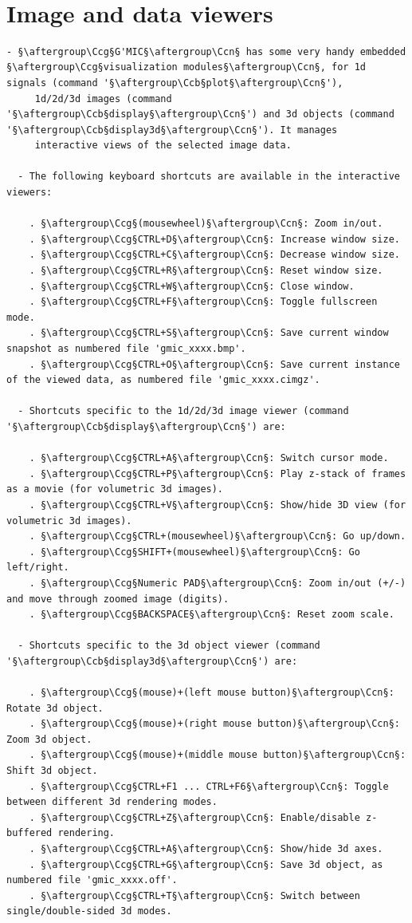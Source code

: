 \documentclass[a4paper,10.5pt,twoside]{book}
\def\Ccb{\color{cb}}
\def\Ccg{\color{cc}}
\def\Ccn{\color{black}}
\begin{document}
\normalsize
~\\\section{Image and data viewers}
\small
\begin{lstlisting}[escapechar=§]
  - §\aftergroup\Ccg§G'MIC§\aftergroup\Ccn§ has some very handy embedded §\aftergroup\Ccg§visualization modules§\aftergroup\Ccn§, for 1d signals (command '§\aftergroup\Ccb§plot§\aftergroup\Ccn§'), 
     1d/2d/3d images (command '§\aftergroup\Ccb§display§\aftergroup\Ccn§') and 3d objects (command '§\aftergroup\Ccb§display3d§\aftergroup\Ccn§'). It manages 
     interactive views of the selected image data. 
 
  - The following keyboard shortcuts are available in the interactive viewers: 
 
    . §\aftergroup\Ccg§(mousewheel)§\aftergroup\Ccn§: Zoom in/out. 
    . §\aftergroup\Ccg§CTRL+D§\aftergroup\Ccn§: Increase window size. 
    . §\aftergroup\Ccg§CTRL+C§\aftergroup\Ccn§: Decrease window size. 
    . §\aftergroup\Ccg§CTRL+R§\aftergroup\Ccn§: Reset window size. 
    . §\aftergroup\Ccg§CTRL+W§\aftergroup\Ccn§: Close window. 
    . §\aftergroup\Ccg§CTRL+F§\aftergroup\Ccn§: Toggle fullscreen mode. 
    . §\aftergroup\Ccg§CTRL+S§\aftergroup\Ccn§: Save current window snapshot as numbered file 'gmic_xxxx.bmp'. 
    . §\aftergroup\Ccg§CTRL+O§\aftergroup\Ccn§: Save current instance of the viewed data, as numbered file 'gmic_xxxx.cimgz'. 
 
  - Shortcuts specific to the 1d/2d/3d image viewer (command '§\aftergroup\Ccb§display§\aftergroup\Ccn§') are: 
 
    . §\aftergroup\Ccg§CTRL+A§\aftergroup\Ccn§: Switch cursor mode. 
    . §\aftergroup\Ccg§CTRL+P§\aftergroup\Ccn§: Play z-stack of frames as a movie (for volumetric 3d images). 
    . §\aftergroup\Ccg§CTRL+V§\aftergroup\Ccn§: Show/hide 3D view (for volumetric 3d images). 
    . §\aftergroup\Ccg§CTRL+(mousewheel)§\aftergroup\Ccn§: Go up/down. 
    . §\aftergroup\Ccg§SHIFT+(mousewheel)§\aftergroup\Ccn§: Go left/right. 
    . §\aftergroup\Ccg§Numeric PAD§\aftergroup\Ccn§: Zoom in/out (+/-) and move through zoomed image (digits). 
    . §\aftergroup\Ccg§BACKSPACE§\aftergroup\Ccn§: Reset zoom scale. 
 
  - Shortcuts specific to the 3d object viewer (command '§\aftergroup\Ccb§display3d§\aftergroup\Ccn§') are: 
 
    . §\aftergroup\Ccg§(mouse)+(left mouse button)§\aftergroup\Ccn§: Rotate 3d object. 
    . §\aftergroup\Ccg§(mouse)+(right mouse button)§\aftergroup\Ccn§: Zoom 3d object. 
    . §\aftergroup\Ccg§(mouse)+(middle mouse button)§\aftergroup\Ccn§: Shift 3d object. 
    . §\aftergroup\Ccg§CTRL+F1 ... CTRL+F6§\aftergroup\Ccn§: Toggle between different 3d rendering modes. 
    . §\aftergroup\Ccg§CTRL+Z§\aftergroup\Ccn§: Enable/disable z-buffered rendering. 
    . §\aftergroup\Ccg§CTRL+A§\aftergroup\Ccn§: Show/hide 3d axes. 
    . §\aftergroup\Ccg§CTRL+G§\aftergroup\Ccn§: Save 3d object, as numbered file 'gmic_xxxx.off'. 
    . §\aftergroup\Ccg§CTRL+T§\aftergroup\Ccn§: Switch between single/double-sided 3d modes.
\end{lstlisting}
\end{document}
